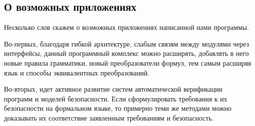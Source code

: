 \subsection{О возможных приложениях}
Несколько слов скажем о возможных приложениях написанной нами программы.

Во-первых, благодаря гибкой архитектуре, слабым связям между модулями через интерфейсы, данный программный комплекс можно расширять, добавлять в него новые правила грамматики, новый преобразователи формул, тем самым расширяя язык и способы эквивалентных преобразований.

Во-вторых, идет активное развитие систем автоматической верификации программ и моделей безопасности. Если сформулировать требования к их безопасности на формальном языке, то примерно теми же методами можно доказывать их соответствие заявленным требованиям и безопасность. 
